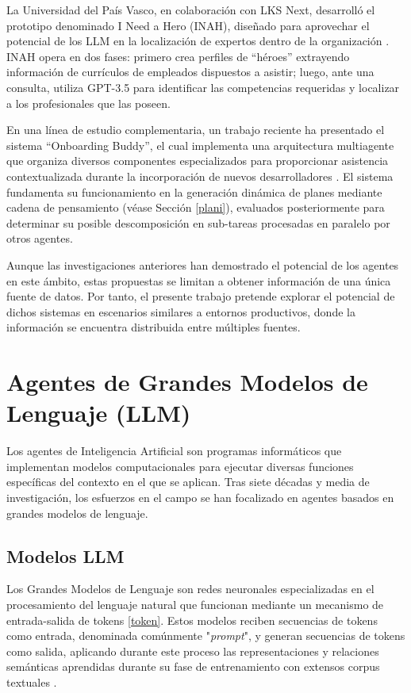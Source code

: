La Universidad del País Vasco, en colaboración con LKS Next, desarrolló el prototipo denominado I Need a Hero (INAH), diseñado para aprovechar el potencial de los LLM en la localización de expertos dentro de la organización \cite{azanza_can_2024}. INAH opera en dos fases: primero crea perfiles de ``héroes'' extrayendo información de currículos de empleados dispuestos a asistir; luego, ante una consulta, utiliza GPT-3.5 para identificar las competencias requeridas y localizar a los profesionales que las poseen.

En una línea de estudio complementaria, un trabajo reciente ha presentado el sistema ``Onboarding Buddy'', el cual implementa una arquitectura multiagente que organiza diversos componentes especializados para proporcionar asistencia contextualizada durante la incorporación de nuevos desarrolladores \cite{cristian_ionescu_multi-agent_2025}. El sistema fundamenta su funcionamiento en la generación dinámica de planes mediante cadena de pensamiento (véase Sección \ref{plani}), evaluados posteriormente para determinar su posible descomposición en sub-tareas procesadas en paralelo por otros agentes.

Aunque las investigaciones anteriores han demostrado el potencial de los agentes en este ámbito, estas propuestas se limitan a obtener información de una única fuente de datos. Por tanto, el presente trabajo pretende explorar el potencial de dichos sistemas en escenarios similares a entornos productivos, donde la información se encuentra distribuida entre múltiples fuentes.

\section{Agentes de Grandes Modelos de Lenguaje (LLM)}

Los agentes de Inteligencia Artificial son programas informáticos que implementan modelos computacionales para ejecutar diversas funciones específicas del contexto en el que se aplican. Tras siete décadas y media de investigación, los esfuerzos en el campo se han focalizado en agentes basados en grandes modelos de lenguaje. 

\subsection{Modelos LLM}

Los Grandes Modelos de Lenguaje son redes neuronales especializadas en el procesamiento del lenguaje natural que funcionan mediante un mecanismo de entrada-salida de tokens \ref{token}. Estos modelos reciben secuencias de tokens como entrada, denominada comúnmente "\textit{prompt}", y generan secuencias de tokens como salida, aplicando durante este proceso las representaciones y relaciones semánticas aprendidas durante su fase de entrenamiento con extensos corpus textuales  \cite{vaswani_attention_2017}.

